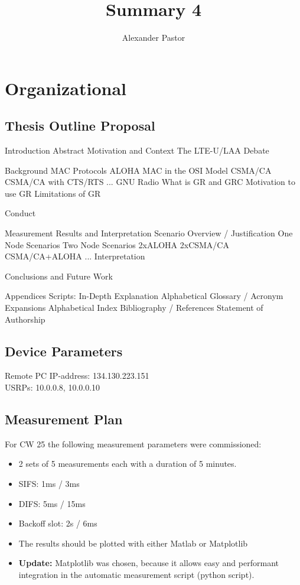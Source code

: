 \documentclass{article}
\begin{document}
	
\title{Summary 4}
\author{Alexander Pastor}
\maketitle
\tableofcontents
\newpage

\section{Organizational}

\subsection{Thesis Outline Proposal}

\begin{outline}[enumerate]
	\1 Introduction
		\2 Abstract
		\2 Motivation and Context
			\3 The LTE-U/LAA Debate 
		
	\1 Background
		\2 MAC Protocols
			\3 ALOHA
			\3 MAC in the OSI Model
		 	\3 CSMA/CA
		 	\3 CSMA/CA with CTS/RTS
		 	\3 ...
		\2 GNU Radio 
			\3 What is GR and GRC
			\3 Motivation to use GR
			\3 Limitations of GR
	
	\1 Conduct
		
	
	\1 Measurement Results and Interpretation
		\2 Scenario Overview / Justification
		\2 One Node Scenarios
		\2 Two Node Scenarios
			\3 2xALOHA
			\3 2xCSMA/CA
			\3 CSMA/CA+ALOHA
		\2 ...
		\2 Interpretation
		
	\1 Conclusions and Future Work
	
	\1 Appendices
		\2 Scripts: In-Depth Explanation
		\2 Alphabetical Glossary / Acronym Expansions
		\2 Alphabetical Index
		\2 Bibliography / References
		\2 Statement of Authorship
\end{outline}

\subsection{Device Parameters}

Remote PC IP-address: 134.130.223.151 \\
USRPs: 10.0.0.8, 10.0.0.10

\subsection{Measurement Plan}

For CW 25 the following measurement parameters were commissioned:

\begin{itemize}
	\item 2 sets of 5 measurements each with a duration of 5 minutes.
	\item SIFS: 1ms / 3ms 
	\item DIFS: 5ms  / 15ms 
	\item Backoff slot: 2s / 6ms
	\item The results should be plotted with either Matlab or Matplotlib
	\item \textbf{Update:}  Matplotlib was chosen, because it allows easy and performant integration in the automatic measurement script (python script).
\end{itemize}
\end{document}
